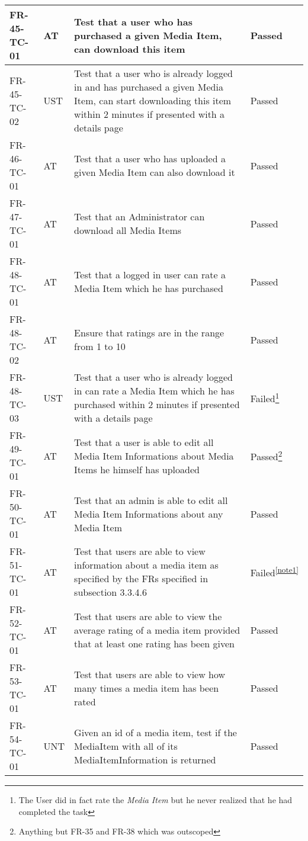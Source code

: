 \documentclass[../report.tex]{subfiles}
\newcommand{\footnoteref}[1]{\textsuperscript{\ref{#1}}}
\begin{document}
\begin{longtable}{|L{2.1cm}|L{1cm}|L{12.4cm}|L{1.4cm}|}
FR-45-TC-01&AT&Test that a user who has purchased a given Media Item, can download this item&Passed  \\ \hline
FR-45-TC-02&UST&Test that a user who is already logged in and has purchased a given Media Item, can start downloading this item within 2 minutes if presented with a details page&Passed  \\ \hline
FR-46-TC-01&AT&Test that a user who has uploaded a given Media Item can also download it&Passed  \\ \hline
FR-47-TC-01&AT&Test that an Administrator can download all Media Items&Passed  \\ \hline
FR-48-TC-01&AT&Test that a logged in user can rate a Media Item which he has purchased&Passed  \\ \hline
FR-48-TC-02&AT&Ensure that ratings are in the range from 1 to 10&Passed  \\ \hline
FR-48-TC-03&UST&Test that a user who is already logged in can rate a Media Item which he has purchased within 2 minutes if presented with a details page&Failed\footnote{The User did in fact rate the \textit{Media Item} but he never realized that he had completed the task}  \\ \hline
FR-49-TC-01&AT&Test that a user is able to edit all Media Item Informations about Media Items he himself has uploaded&Passed\footnote{Anything but FR-35 and FR-38 which was outscoped}  \\ \hline
FR-50-TC-01&AT&Test that an admin is able to edit all Media Item Informations about any Media Item&Passed  \\ \hline
FR-51-TC-01&AT&Test that users are able to view information about a media item as specified by the FRs specified in subsection 3.3.4.6&Failed\footnoteref{note1}  \\ \hline
FR-52-TC-01&AT&Test that users are able to view the average rating of a media item provided that at least one rating has been given&Passed  \\ \hline
FR-53-TC-01&AT&Test that users are able to view how many times a media item has been rated&Passed  \\ \hline
FR-54-TC-01&UNT&Given an id of a media item, test if the MediaItem with all of its MediaItemInformation is returned&Passed  \\ \hline

\end{longtable}
\end{document}
